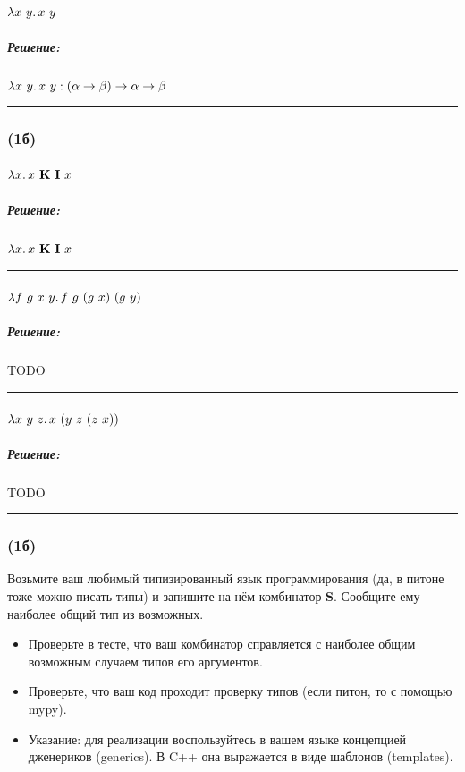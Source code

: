 \documentclass{article}
\newenvironment{proof}{\subparagraph{\hspace{-1em}Решение:\newline}\-}{\par\noindent\rule{\textwidth}{0.4pt}}
\newcommand{\term}[1]{\mathbf{#1}}
\newcommand{\ap}{~}
\begin{document}
    \paragraph{} $\lambda x~y\ldotp x \ap y$

    \begin{proof}
        $\lambda x~y\ldotp x~y : (\alpha \to \beta) \to \alpha \to \beta$
    \end{proof}

    \subsubsection{(1б)}

    \paragraph{} $\lambda x\ldotp x \ap \term{K} \ap \term{I} \ap x$

    \begin{proof}
        $\lambda x\ldotp x \ap \term{K} \ap \term{I} \ap x$
    \end{proof}

    \paragraph{} $\lambda f~g~x~y\ldotp f \ap g \ap (g \ap x) \ap (g \ap y)$

    \begin{proof}
        TODO %
    \end{proof}

    \paragraph{} $\lambda x~y~z\ldotp x~(y~z~(z~x))$

    \begin{proof}
        TODO %
    \end{proof}

    \subsubsection{(1б)}

    Возьмите ваш любимый типизированный язык программирования (да, в питоне тоже можно писать типы) и запишите на нём комбинатор $\term{S}$.
    Сообщите ему наиболее общий тип из возможных.
    \begin{itemize}
        \item Проверьте в тесте, что ваш комбинатор справляется с наиболее общим возможным случаем типов его аргументов.
        \item Проверьте, что ваш код проходит проверку типов (если питон, то с помощью mypy).
        \item Указание: для реализации воспользуйтесь в вашем языке концепцией дженериков (generics).
        В C++ она выражается в виде шаблонов (templates).
    \end{itemize}
\end{document}
